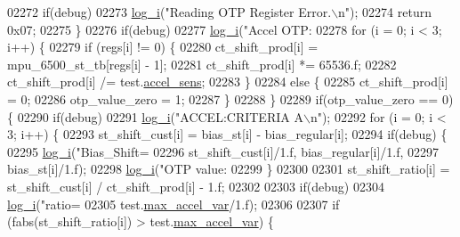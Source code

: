 \begin{DoxyCode}
{{{{{{{02272         \textcolor{keywordflow}{if}(debug)
02273             \hyperlink{inv__mpu_8c_a67fc07fa528d8e62dc7b88a847b563f5}{log\_i}(\textcolor{stringliteral}{"Reading OTP Register Error.\(\backslash\)n"});
02274         \textcolor{keywordflow}{return} 0x07;
02275     \}
02276     \textcolor{keywordflow}{if}(debug)
02277         \hyperlink{inv__mpu_8c_a67fc07fa528d8e62dc7b88a847b563f5}{log\_i}(\textcolor{stringliteral}{"Accel OTP:%
02278     \textcolor{keywordflow}{for} (i = 0; i < 3; i++) \{
02279         \textcolor{keywordflow}{if} (regs[i] != 0) \{
02280             ct\_shift\_prod[i] = mpu\_6500\_st\_tb[regs[i] - 1];
02281             ct\_shift\_prod[i] *= 65536.f;
02282             ct\_shift\_prod[i] /= test.\hyperlink{structtest__s_a22a1d8ebbceb431baa0dfdc911fbc8ab}{accel\_sens};
02283         \}
02284         \textcolor{keywordflow}{else} \{
02285             ct\_shift\_prod[i] = 0;
02286             otp\_value\_zero = 1;
02287         \}
02288     \}
02289     \textcolor{keywordflow}{if}(otp\_value\_zero == 0) \{
02290         \textcolor{keywordflow}{if}(debug)
02291             \hyperlink{inv__mpu_8c_a67fc07fa528d8e62dc7b88a847b563f5}{log\_i}(\textcolor{stringliteral}{"ACCEL:CRITERIA A\(\backslash\)n"});
02292         \textcolor{keywordflow}{for} (i = 0; i < 3; i++) \{
02293             st\_shift\_cust[i] = bias\_st[i] - bias\_regular[i];
02294             \textcolor{keywordflow}{if}(debug) \{
02295                 \hyperlink{inv__mpu_8c_a67fc07fa528d8e62dc7b88a847b563f5}{log\_i}(\textcolor{stringliteral}{"Bias\_Shift=%
02296                         st\_shift\_cust[i]/1.f, bias\_regular[i]/1.f,
02297                         bias\_st[i]/1.f);
02298                 \hyperlink{inv__mpu_8c_a67fc07fa528d8e62dc7b88a847b563f5}{log\_i}(\textcolor{stringliteral}{"OTP value: %
02299             \}
02300 
02301             st\_shift\_ratio[i] = st\_shift\_cust[i] / ct\_shift\_prod[i] - 1.f;
02302 
02303             \textcolor{keywordflow}{if}(debug)
02304                 \hyperlink{inv__mpu_8c_a67fc07fa528d8e62dc7b88a847b563f5}{log\_i}(\textcolor{stringliteral}{"ratio=%
02305                             test.\hyperlink{structtest__s_ad5bc54ab7d1b1a0f158ca1a79359c3bc}{max\_accel\_var}/1.f);
02306 
02307             \textcolor{keywordflow}{if} (fabs(st\_shift\_ratio[i]) > test.\hyperlink{structtest__s_ad5bc54ab7d1b1a0f158ca1a79359c3bc}{max\_accel\_var}) \{
}}}}}}}}}}}
\end{DoxyCode}
